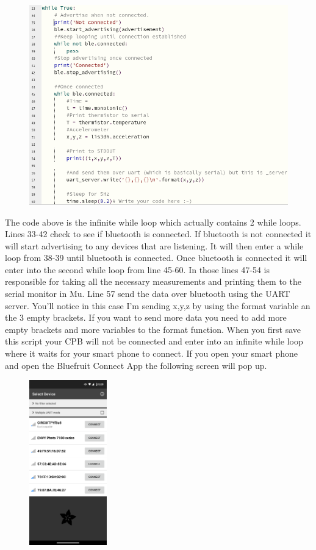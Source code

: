 \begin{figure}[H]
  \begin{center}
    \includegraphics[width=\textwidth]{Figures/bluetooth_code1.png}
  \end{center}
\end{figure}
The code above is the infinite while loop which actually contains 2 while loops. Lines 33-42 check to see if bluetooth is connected. If bluetooth is not connected it will start advertising to any devices that are listening. It will then enter a while loop from 38-39 until bluetooth is connected. Once bluetooth is connected it will enter into the second while loop from line 45-60. In those lines 47-54 is responsible for taking all the necessary measurements and printing them to the serial monitor in Mu. Line 57 send the data over bluetooth using the UART server. You'll notice in this case I'm sending x,y,z by using the format variable an the 3 empty {} brackets. If you want to send more data you need to add more empty brackets and more variables to the format function. When you first save this script your CPB will not be connected and enter into an infinite while loop where it waits for your smart phone to connect. If you open your smart phone and open the Bluefruit Connect App the following screen will pop up.
\begin{figure}[H]
  \begin{center}
    \includegraphics[width=0.3\textwidth]{Figures/phoneapp1.png}
  \end{center}
\end{figure}
